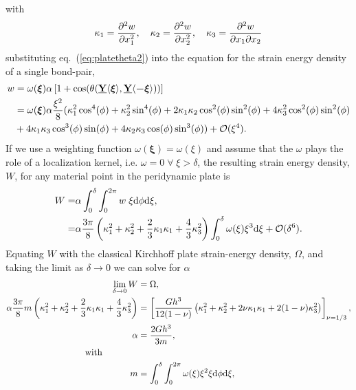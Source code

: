 %
with
%
\begin{equation}
    \kappa_1=\frac{\partial^2 w}{\partial x_1^2}, \quad \kappa_2= \frac{\partial^2 w}{\partial x_2^2}, \quad \kappa_3=\frac{\partial^2 w}{\partial x_1\partial x_2}\notag
\end{equation}
%
substituting eq.~(\ref{eq:platetheta2}) into the equation for the strain energy density of a single bond-pair,
%
\begin{align}
    w &= \omega(\boldsymbol{\xi}) \alpha \left[1+\cos(\theta(\vstate{Y}{}{\boldsymbol{\xi}},\vstate{Y}{}{\boldsymbol{-\xi}}) ) \right] \notag \\
    &= \omega(\boldsymbol{\xi}) \alpha\frac{\xi^2}{8}(\kappa_1^2\cos^4(\phi)+\kappa_2^2\sin^4(\phi)+2\kappa_1\kappa_2\cos^2(\phi)\sin^2(\phi)+4\kappa_3^2\cos^2(\phi)\sin^2(\phi) \notag \\
    &+ 4\kappa_1\kappa_3\cos^3(\phi)\sin(\phi)+4\kappa_2\kappa_3\cos(\phi)\sin^3(\phi))+\mathcal{O}(\xi^4).\notag
\end{align}
%
If we use a weighting function \(\omega(\boldsymbol{\xi})=\omega(\xi)\) and assume that the $\omega$ plays the role of a localization kernel, i.e. $\omega = 0 \; \forall \; \xi > \delta$, the resulting strain energy density, $W$, for any material point in the peridynamic plate is
%
\begin{align}
    W =& \alpha \int_{0}^\delta\int_0^{2 \pi} w\; \xi {\rm d}\phi {\rm d}\xi ,\notag \\
    =& \alpha \frac{3\pi}{8} \left(\kappa_1^2+\kappa_2^2+\frac{2}{3}\kappa_1\kappa_1+\frac{4}{3}\kappa_3^2 \right)\int_{0}^\delta \omega(\xi)\xi^3{\rm d}\xi + \mathcal{O}(\delta^6).\notag 
\end{align}
%
Equating $W$ with the classical Kirchhoff plate strain-energy density, $\Omega$, and taking the limit as $\delta \to 0$ we can solve for $\alpha$
%
\begin{align}
    \lim_{\delta \to 0}  W &= \Omega, \notag \\
    \alpha \frac{3 \pi}{8} m \left(\kappa_1^2+\kappa_2^2+\frac{2}{3}\kappa_1\kappa_1+\frac{4}{3}\kappa_3^2 \right)&= \left[ \frac{G h^3}{12(1-\nu)} \left(\kappa_1^2+\kappa_2^2+2\nu\kappa_1\kappa_1+2(1-\nu)\kappa_3^2 \right) \right]_{\nu=1/3}, \notag \\
    \alpha &= \frac{2 G h^3}{3 m}, \\
    \text{with}\qquad \qquad \notag \\
    m &= \int_{0}^{\delta} \int_{0}^{2\pi}\omega(\xi) \xi^2 \xi {\rm d}\phi {\rm d}\xi \notag,
\end{align}
